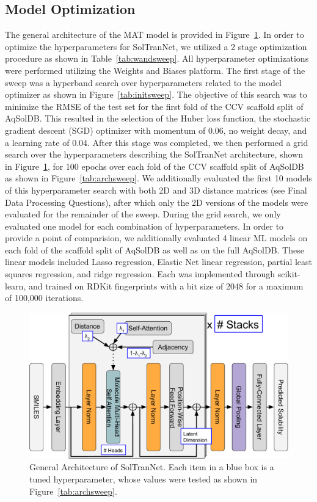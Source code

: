 \documentclass[journal=jmcmar,manuscript=article]{achemso}
\begin{document}
\subsection{Model Optimization}
The general architecture of the MAT model is provided in Figure~\ref{fig:architecture}.
In order to optimize the hyperparameters for SolTranNet, we utilized a 2 stage optimization procedure as shown in Table~\ref{tab:wandsweep}.
All hyperparameter optimizations were performed utilizing the Weights and Biases platform\cite{wandb}.
The first stage of the sweep was a hyperband search over hyperparameters related to the model optimizer as shown in Figure~\ref{tab:initsweep}. 
The objective of this search was to minimize the RMSE of the test set for the first fold of the CCV scaffold split of AqSolDB.
This resulted in the selection of the Huber loss function, the stochastic gradient descent (SGD) optimizer with momentum of 0.06, no weight decay, and a learning rate of 0.04.
After this stage was completed, we then performed a grid search over the hyperparameters describing the SolTranNet architecture, shown in Figure~\ref{fig:architecture}, for 100 epochs over each fold of the CCV scaffold split of AqSolDB as shown in Figure~\ref{tab:archsweep}.
We additionally evaluated the first 10 models of this hyperparameter search with both 2D and 3D distance matrices (see Final Data Processing Questions), after which only the 2D versions of the models were evaluated for the remainder of the sweep.
During the grid search, we only evaluated one model for each combination of hyperparameters.
In order to provide a point of comparision, we additionally evaluated 4 linear ML models on each fold of the scaffold split of AqSolDB as well as on the full AqSolDB.
These linear models included Lasso regression, Elastic Net linear regression, partial least squares regression, and ridge regression.
Each was implemented through scikit-learn\cite{scikit-learn}, and trained on RDKit fingerprints with a bit size of 2048 for a maximum of 100,000 iterations.

\begin{figure}[tb]
    \centering
    \includegraphics[width=\linewidth]{figures/soltrannet_architecture.pdf}
    \caption{General Architecture of SolTranNet. Each item in a blue box is a tuned hyperparameter, whose values were tested as shown in Figure~\ref{tab:archsweep}.}
    \label{fig:architecture}
\end{figure}
\end{document}
